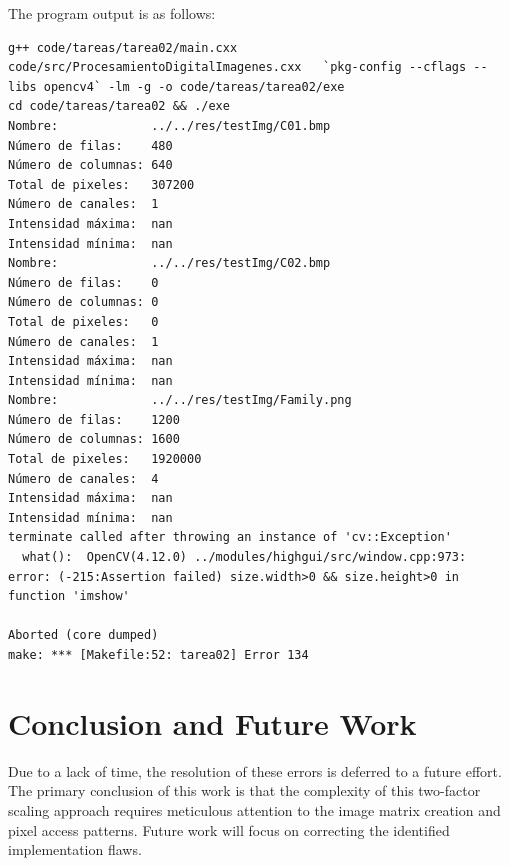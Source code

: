 \documentclass[10pt]{article}
\begin{document}
The program output is as follows:
\begin{lstlisting}[backgroundcolor=\color{gray!10}, basicstyle=\ttfamily\small, frame=single]
g++ code/tareas/tarea02/main.cxx  code/src/ProcesamientoDigitalImagenes.cxx   `pkg-config --cflags --libs opencv4` -lm -g -o code/tareas/tarea02/exe
cd code/tareas/tarea02 && ./exe
Nombre:             ../../res/testImg/C01.bmp
Número de filas:    480
Número de columnas: 640
Total de pixeles:   307200
Número de canales:  1
Intensidad máxima:  nan
Intensidad mínima:  nan
Nombre:             ../../res/testImg/C02.bmp
Número de filas:    0
Número de columnas: 0
Total de pixeles:   0
Número de canales:  1
Intensidad máxima:  nan
Intensidad mínima:  nan
Nombre:             ../../res/testImg/Family.png
Número de filas:    1200
Número de columnas: 1600
Total de pixeles:   1920000
Número de canales:  4
Intensidad máxima:  nan
Intensidad mínima:  nan
terminate called after throwing an instance of 'cv::Exception'
  what():  OpenCV(4.12.0) ../modules/highgui/src/window.cpp:973: error: (-215:Assertion failed) size.width>0 && size.height>0 in function 'imshow'

Aborted (core dumped)
make: *** [Makefile:52: tarea02] Error 134
\end{lstlisting}

\section{Conclusion and Future Work}

Due to a lack of time, the resolution of these errors is deferred to a future effort. The primary conclusion of this work is that the complexity of this two-factor scaling approach requires meticulous attention to the image matrix creation and pixel access patterns. Future work will focus on correcting the identified implementation flaws.
\end{document}
